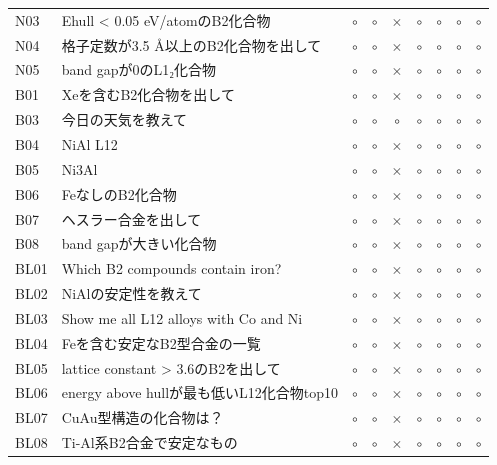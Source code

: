 \documentclass[3p]{elsarticle}
\begin{document}
\begin{longtable}{lp{5cm}ccccccc}
  N03 & Ehull < 0.05 eV/atomのB2化合物 & $\circ$ & $\circ$ & $\times$ & $\circ$ & $\circ$ & $\circ$ & $\circ$ \\
  N04 & 格子定数が3.5 Å以上のB2化合物を出して & $\circ$ & $\circ$ & $\times$ & $\circ$ & $\circ$ & $\circ$ & $\circ$ \\
  N05 & band gapが0のL1₂化合物 & $\circ$ & $\circ$ & $\times$ & $\circ$ & $\circ$ & $\circ$ & $\circ$ \\
  B01 & Xeを含むB2化合物を出して & $\circ$ & $\circ$ & $\times$ & $\circ$ & $\circ$ & $\circ$ & $\circ$ \\
  B03 & 今日の天気を教えて & $\circ$ & $\circ$ & $\circ$ & $\circ$ & $\circ$ & $\circ$ & $\circ$ \\
  B04 & NiAl L12 & $\circ$ & $\circ$ & $\times$ & $\circ$ & $\circ$ & $\circ$ & $\circ$ \\
  B05 & Ni3Al & $\circ$ & $\circ$ & $\times$ & $\circ$ & $\circ$ & $\circ$ & $\circ$ \\
  B06 & FeなしのB2化合物 & $\circ$ & $\circ$ & $\times$ & $\circ$ & $\circ$ & $\circ$ & $\circ$ \\
  B07 & ヘスラー合金を出して & $\circ$ & $\circ$ & $\times$ & $\circ$ & $\circ$ & $\circ$ & $\circ$ \\
  B08 & band gapが大きい化合物 & $\circ$ & $\circ$ & $\times$ & $\circ$ & $\circ$ & $\circ$ & $\circ$ \\
  BL01 & Which B2 compounds contain iron? & $\circ$ & $\circ$ & $\times$ & $\circ$ & $\circ$ & $\circ$ & $\circ$ \\
  BL02 & NiAlの安定性を教えて & $\circ$ & $\circ$ & $\times$ & $\circ$ & $\circ$ & $\circ$ & $\circ$ \\
  BL03 & Show me all L12 alloys with Co and Ni & $\circ$ & $\circ$ & $\times$ & $\circ$ & $\circ$ & $\circ$ & $\circ$ \\
  BL04 & Feを含む安定なB2型合金の一覧 & $\circ$ & $\circ$ & $\times$ & $\circ$ & $\circ$ & $\circ$ & $\circ$ \\
  BL05 & lattice constant > 3.6のB2を出して & $\circ$ & $\circ$ & $\times$ & $\circ$ & $\circ$ & $\circ$ & $\circ$ \\
  BL06 & energy above hullが最も低いL12化合物top10 & $\circ$ & $\circ$ & $\times$ & $\circ$ & $\circ$ & $\circ$ & $\circ$ \\
  BL07 & CuAu型構造の化合物は？ & $\circ$ & $\circ$ & $\times$ & $\circ$ & $\circ$ & $\circ$ & $\circ$ \\
  BL08 & Ti-Al系B2合金で安定なもの & $\circ$ & $\circ$ & $\times$ & $\circ$ & $\circ$ & $\circ$ & $\circ$ \\

\end{longtable}
\end{document}
